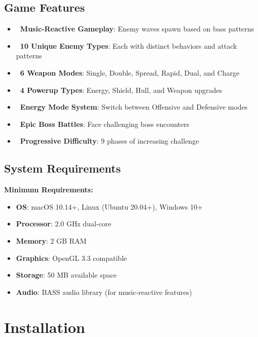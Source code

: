 \documentclass[11pt,a4paper]{article}
\begin{document}
\subsection{Game Features}

\begin{itemize}[leftmargin=*]
    \item \textbf{\faMusic~Music-Reactive Gameplay}: Enemy waves spawn based on bass patterns
    \item \textbf{\faRocket~10 Unique Enemy Types}: Each with distinct behaviors and attack patterns
    \item \textbf{\faCrosshairs~6 Weapon Modes}: Single, Double, Spread, Rapid, Dual, and Charge
    \item \textbf{\faStar~4 Powerup Types}: Energy, Shield, Hull, and Weapon upgrades
    \item \textbf{\faBolt~Energy Mode System}: Switch between Offensive and Defensive modes
    \item \textbf{\faSkull~Epic Boss Battles}: Face challenging boss encounters
    \item \textbf{\faChartLine~Progressive Difficulty}: 9 phases of increasing challenge
\end{itemize}

\subsection{System Requirements}

\begin{tcolorbox}[mybox]
\textbf{Minimum Requirements:}
\begin{itemize}[nosep]
    \item \textbf{OS}: macOS 10.14+, Linux (Ubuntu 20.04+), Windows 10+
    \item \textbf{Processor}: 2.0 GHz dual-core
    \item \textbf{Memory}: 2 GB RAM
    \item \textbf{Graphics}: OpenGL 3.3 compatible
    \item \textbf{Storage}: 50 MB available space
    \item \textbf{Audio}: BASS audio library (for music-reactive features)
\end{itemize}
\end{tcolorbox}

\section{Installation}
\end{document}
